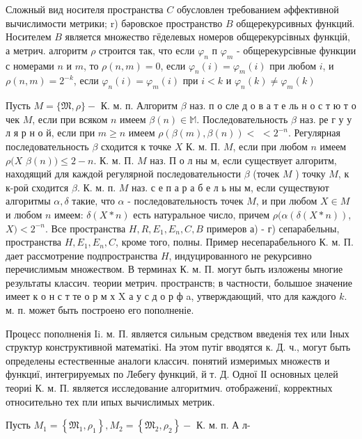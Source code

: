 \documentclass[10pt]{article}
\begin{document}
Сложный вид носителя пространства $C$ обусловлен требованием әффективной вычислимости метрики; r) бәровское пространство $B$ общерекурсивных функций. Носителем $B$ является множество гёделевых номеров общерекурсівных функціӥ, а метрич. алгоритм $\rho$ строится так, что если $\varphi_{n}$ п $\varphi_{m}$ - общерекурсівные функции с номерами $n$ и $m$, то $\rho(n, m)=0$, если $\varphi_{n}(i)=\varphi_{m}(i)$ при любом $i$, и $\rho(n, m)=2^{-k}$, если $\varphi_{n}(i)=\varphi_{m}(i)$ при $i<k$ и $\varphi_{n}(k) \neq \varphi_{m}(k)$



Пусть $M=\{\mathfrak{M}, \rho\}-$ К. м. п. Алгоритм $\beta$ наз. п о сле д о в а т е ль н о с т ю т о чек $M$, если при всяком $n$ имеем $\beta(n) \in \mathbb{M}$. Последовательность $\beta$ наз. ре г у у л я р н о й, если при $m \geqslant n$ имеем $\rho(\beta(m), \beta(n))<$ $<2^{-n}$. Регулярная последовательность $\beta$ сходится к точке $X$ К. м. П. $M$, если при любом $n$ имеем $\rho(X$ $\beta(n)) \leqslant 2-n$. К. м. П. $M$ наз. П о л ны м, если существует алгоритм, находящий для каждой регулярной последовательности $\beta$ (точек $M$ ) точку $M$, к к-роӥ сходится $\beta$. К. м. п. $M$ наз. с е п а р а б е л ь ны м, если существуют алгоритмы $\alpha, \delta$ такие, что $\alpha$ - последовательность точек $M$, и при любом $X \in M$ и любом $n$ имеем: $\delta(X * n)$ есть натуральное число, причем $\rho(\alpha(\delta(X * n))$, $X)<2^{-n}$. Все пространства $H, R, E_{1}, E_{n}, C, B$ примеров а) - г) сепарабельны, пространства $H, E_{1}, E_{n}, C$, кроме того, полны. Пример несепарабельного К. м. П. дает рассмотрение подпространства $H$, индуцированного не рекурсивно перечислимым множеством. В терминах К. м. П. могут быть изложены многие результаты классич. теории метрич. пространств; в частности, болышое значение имеет к о н с т те о р м х X а у с д о р ф a, утверждающий, что для каждого $k$. м. п. может быть построено его пополненіе.



Процесс пополненія Ii. м. П. является сильным средством введенія тех или Іных структур конструктивной математікі. На этом путіг вводятся к. Д. ч., могут быть определены естественные аналоги классич. понятий измеримых множеств и функциї, интегрируемых по Лебегу функций, й т. Д. Одної ІІ основных целей теориі К. м. П. является исследование алгоритмич. отображениї, корректных относительно тех пли ипых вычислимых метрик.



Пусть $M_{1}=\left\{\mathfrak{M}_{1}, \rho_{1}\right\}, M_{2}=\left\{\mathfrak{M}_{2}, \rho_{2}\right\}-$ К. м. п. А л-
\end{document}
